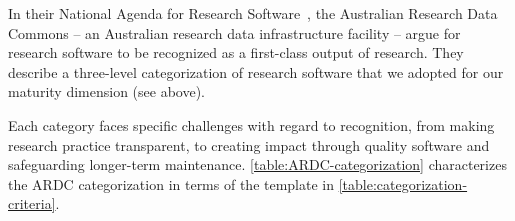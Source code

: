 \documentclass{IEEEcsmag}
\begin{document}
In their National Agenda for Research Software~\cite{ARDC2022}, the Australian Research Data Commons -- an Australian research data infrastructure facility -- argue for research software to be recognized as a first-class output of research. They describe a three-level categorization of research software that we adopted for our maturity dimension (see above).

Each category faces specific challenges with regard to recognition, from making research practice transparent, to creating impact through quality software and safeguarding longer-term maintenance. \autoref{table:ARDC-categorization} characterizes the ARDC categorization in terms of the template in \autoref{table:categorization-criteria}.

%
%
%
%
%
\end{document}
